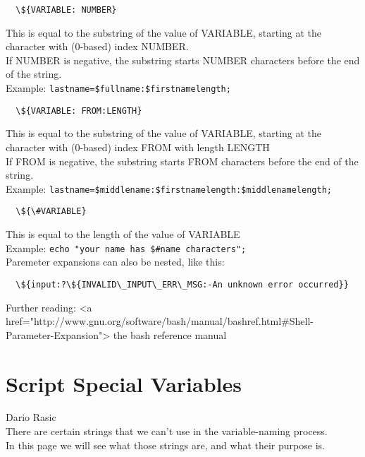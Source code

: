 \documentclass[hidelinks,12pt,a4paper,numbers=enddot]{scrartcl}
\begin{document}
\begin{verbatim}
  \${VARIABLE: NUMBER}
\end{verbatim}

This is equal to the substring of the value of VARIABLE, starting at the character with
(0-based) index NUMBER.\\
If NUMBER is negative, the substring starts NUMBER characters before the end of the string.\\
Example: \texttt{lastname=\${fullname:\$firstnamelength};}\\

\begin{verbatim}
  \${VARIABLE: FROM:LENGTH}
\end{verbatim}

This is equal to the substring of the value of VARIABLE, starting at the character with (0-based)
index FROM with length LENGTH\\
If FROM is negative, the substring starts FROM characters before the end of the string.\\
Example: \texttt{lastname=\${middlename:\$firstnamelength:\$middlenamelength};}\\

\begin{verbatim}
  \${\#VARIABLE}
\end{verbatim}

This is equal to the length of the value of VARIABLE\\
Example: \texttt{echo "your name has \${\#name} characters";}\\

Paremeter expansions can also be nested, like this:

\begin{verbatim}
  \${input:?\${INVALID\_INPUT\_ERR\_MSG:-An unknown error occurred}}
\end{verbatim}

Further reading: <a href="http://www.gnu.org/software/bash/manual/bashref.html\#Shell-Parameter-Expansion">
the bash reference manual

\section{Script Special Variables}


\large Dario Rasic \normalsize\\



There are certain strings that we can't use in the variable-naming process.\\
In this page we will see what those strings are, and what their purpose is.\\
\end{document}
